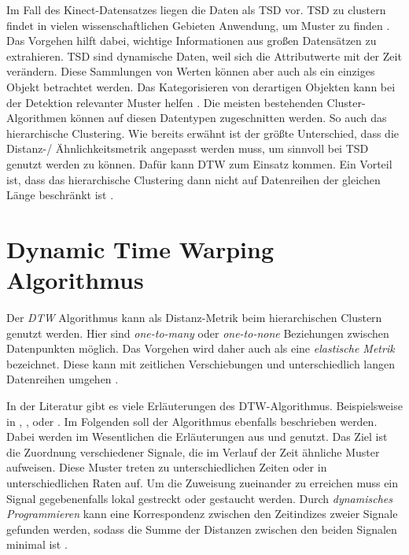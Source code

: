Im Fall des Kinect-Datensatzes liegen die Daten als \ac{TSD} vor.
\ac{TSD} zu clustern findet in vielen wissenschaftlichen Gebieten Anwendung, um Muster zu finden \citep{aghabozorgi_time-series_2015}.
Das Vorgehen hilft dabei, wichtige Informationen aus großen Datensätzen zu extrahieren.
\ac{TSD} sind dynamische Daten, weil sich die Attributwerte mit der Zeit verändern.
Diese Sammlungen von Werten können aber auch als ein einziges Objekt betrachtet werden.
Das Kategorisieren von derartigen Objekten kann bei der Detektion relevanter Muster helfen \citep{aghabozorgi_time-series_2015}.
Die meisten bestehenden Cluster-Algorithmen können auf diesen Datentypen zugeschnitten werden.
So auch das hierarchische Clustering.
Wie bereits erwähnt ist der größte Unterschied, dass die Distanz-/ Ähnlichkeitsmetrik angepasst werden muss,
um sinnvoll bei \ac{TSD} genutzt werden zu können.
Dafür kann \ac*{DTW} zum Einsatz kommen.
Ein Vorteil ist, dass das hierarchische Clustering dann
nicht auf Datenreihen der gleichen Länge beschränkt ist \citep{warren_liao_clustering_2005}.

\section{Dynamic Time Warping Algorithmus}
\label{3-DTW}
Der \emph{\ac{DTW}} Algorithmus kann als Distanz-Metrik beim hierarchischen Clustern genutzt werden.
Hier sind \emph{one-to-many} oder \emph{one-to-none} Beziehungen zwischen Datenpunkten möglich.
Das Vorgehen wird daher auch als eine \emph{elastische Metrik} bezeichnet.
Diese kann mit zeitlichen Verschiebungen und unterschiedlich langen Datenreihen umgehen \citep{aghabozorgi_time-series_2015}.

In der Literatur  gibt es viele Erläuterungen des \ac{DTW}-Algorithmus.
Beispielsweise in \citet{mohammadzade_dynamic_2021}, \citet{warren_liao_clustering_2005},
\citet{aghabozorgi_time-series_2015} oder \citet{yu_dynamic_2019}.
Im Folgenden soll der Algorithmus ebenfalls beschrieben werden.
Dabei werden im Wesentlichen die Erläuterungen aus \citet{mohammadzade_dynamic_2021} und \citet{warren_liao_clustering_2005} genutzt.
Das Ziel ist die Zuordnung verschiedener Signale,
die im Verlauf der Zeit ähnliche Muster aufweisen.
Diese Muster treten zu unterschiedlichen Zeiten oder in unterschiedlichen Raten auf.
Um die Zuweisung zueinander zu erreichen muss ein Signal gegebenenfalls lokal gestreckt oder gestaucht werden.
Durch \emph{dynamisches Programmieren} kann eine Korrespondenz zwischen den Zeitindizes zweier Signale gefunden werden,
sodass die Summe der Distanzen zwischen den beiden Signalen minimal ist \citep{mohammadzade_dynamic_2021}.

